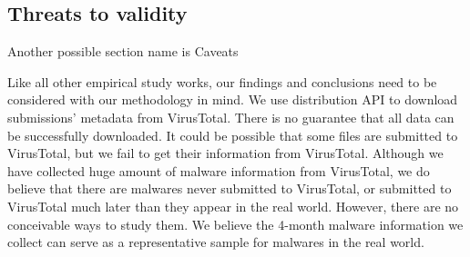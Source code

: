 \subsection{Threats to validity}

{\color{red} Another possible section name is Caveats}

Like all other empirical study works, 
our findings and conclusions need to be considered with our methodology in mind. 
We use distribution API to download submissions' metadata from VirusTotal. 
There is no guarantee that all data can be successfully downloaded. 
It could be possible that some files are submitted to VirusTotal, 
but we fail to get their information from VirusTotal.
Although we have collected huge amount of malware information from VirusTotal,
we do believe that there are malwares never submitted to VirusTotal, 
or submitted to VirusTotal much later than they appear in the real world. 
However, there are no conceivable ways to study them.
We believe the 4-month malware information we collect can serve as a representative sample for malwares in the real world. 
